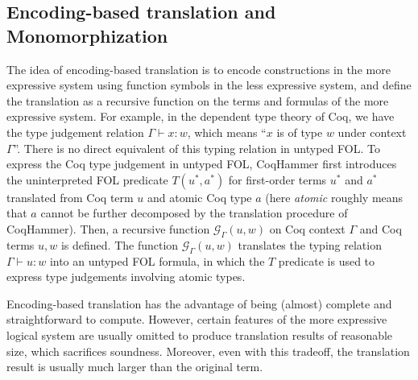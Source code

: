 \subsection{Encoding-based translation and Monomorphization}\label{subencmon}

  The idea of encoding-based translation is to encode
  constructions in the more expressive system using function symbols in the less
  expressive system, and define the translation as a recursive function on the terms and formulas
  of the more expressive system. For example, in the dependent type theory of Coq,
  we have the type judgement relation $\Gamma \vdash x : w$, which means ``$x$ is of
  type $w$ under context $\Gamma$''. There is no direct equivalent of this
  typing relation in untyped FOL. To express the Coq type judgement in untyped FOL, 
  CoqHammer first introduces the uninterpreted FOL predicate $T(u^*, a^*)$ for
  first-order terms $u^*$ and $a^*$ translated from Coq term $u$ and atomic Coq type $a$
  (here \textit{atomic} roughly means that $a$ cannot be
  further decomposed by the translation procedure of CoqHammer). Then, a recursive function
  $\mathcal{G}_\Gamma(u, w)$ on Coq context $\Gamma$ and Coq terms $u, w$ is defined.
  The function $\mathcal{G}_\Gamma(u, w)$ translates the typing relation $\Gamma \vdash u : w$ into an untyped FOL formula,
  in which the $T$ predicate is used to express type judgements involving atomic types.
  
  Encoding-based translation has the advantage of being (almost) complete
  and straightforward to compute. However, certain features of the more expressive
  logical system are usually omitted to produce translation results of reasonable size,
  which sacrifices soundness. Moreover, even with this tradeoff, the translation result is usually much larger
  than the original term.

